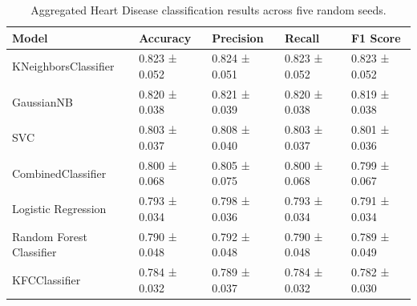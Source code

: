 \begin{table}
\caption{Aggregated Heart Disease classification results across five random seeds.}
\label{tab:heart_aggregated_results}
\begin{tabular}{lllll}
\toprule
Model & Accuracy & Precision & Recall & F1 Score \\
\midrule
KNeighborsClassifier & 0.823 ± 0.052 & 0.824 ± 0.051 & 0.823 ± 0.052 & 0.823 ± 0.052 \\
GaussianNB & 0.820 ± 0.038 & 0.821 ± 0.039 & 0.820 ± 0.038 & 0.819 ± 0.038 \\
SVC & 0.803 ± 0.037 & 0.808 ± 0.040 & 0.803 ± 0.037 & 0.801 ± 0.036 \\
CombinedClassifier & 0.800 ± 0.068 & 0.805 ± 0.075 & 0.800 ± 0.068 & 0.799 ± 0.067 \\
Logistic Regression & 0.793 ± 0.034 & 0.798 ± 0.036 & 0.793 ± 0.034 & 0.791 ± 0.034 \\
Random Forest Classifier & 0.790 ± 0.048 & 0.792 ± 0.048 & 0.790 ± 0.048 & 0.789 ± 0.049 \\
KFCClassifier & 0.784 ± 0.032 & 0.789 ± 0.037 & 0.784 ± 0.032 & 0.782 ± 0.030 \\
\bottomrule
\end{tabular}
\end{table}
